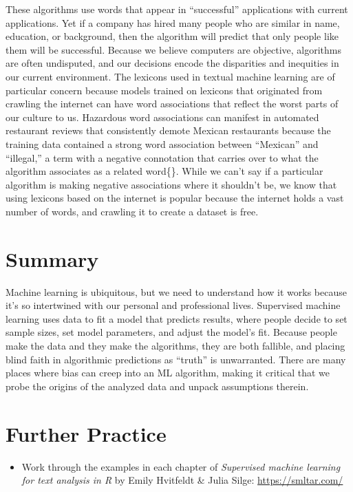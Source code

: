 \documentclass[
  krantz2]{krantz}
\providecommand{\tightlist}{%
  \setlength{\itemsep}{0pt}\setlength{\parskip}{0pt}}
\begin{document}
These algorithms use words that appear in ``successful'' applications with current applications. Yet if a company has hired many people who are similar in name, education, or background, then the algorithm will predict that only people like them will be successful. Because we believe computers are objective, algorithms are often undisputed, and our decisions encode the disparities and inequities in our current environment. The lexicons used in textual machine learning are of particular concern because models trained on lexicons that originated from crawling the internet can have word associations that reflect the worst parts of our culture to us. Hazardous word associations can manifest in automated restaurant reviews that consistently demote Mexican restaurants because the training data contained a strong word association between ``Mexican'' and ``illegal,'' a term with a negative connotation that carries over to what the algorithm associates as a related word\{\citet{shane2019}\}. While we can't say if a particular algorithm is making negative associations where it shouldn't be, we know that using lexicons based on the internet is popular because the internet holds a vast number of words, and crawling it to create a dataset is free.

\hypertarget{ml-summary}{%
\section{Summary}\label{ml-summary}}

Machine learning is ubiquitous, but we need to understand how it works because it's so intertwined with our personal and professional lives. Supervised machine learning uses data to fit a model that predicts results, where people decide to set sample sizes, set model parameters, and adjust the model's fit. Because people make the data and they make the algorithms, they are both fallible, and placing blind faith in algorithmic predictions as ``truth'' is unwarranted. There are many places where bias can creep into an ML algorithm, making it critical that we probe the origins of the analyzed data and unpack assumptions therein.

\hypertarget{ml-study}{%
\section{Further Practice}\label{ml-study}}

\begin{itemize}
\tightlist
\item
  Work through the examples in each chapter of \emph{Supervised machine learning for text analysis in R} by Emily Hvitfeldt \& Julia Silge: \url{https://smltar.com/}
\end{itemize}
\end{document}
